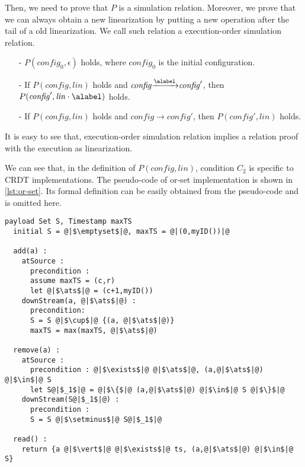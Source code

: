 Then, we need to prove that $P$ is a simulation relation. Moreover, we prove that we can always obtain a new linearization by putting a new operation after the tail of a old linearization. We call such relation a execution-order simulation relation.

\begin{itemize}
\setlength{\itemsep}{0.5pt}
\item[-] $P(\mathit{config}_0,\epsilon)$ holds, where $\mathit{config}_0$ is the initial configuration.

\item[-] If $P(\mathit{config},\mathit{lin})$ holds and $\mathit{config} {\xrightarrow{\alabel}} \mathit{config}'$, then $P(\mathit{config}', \mathit{lin} \cdot \alabel)$ holds.

\item[-] If $P(\mathit{config},\mathit{lin})$ holds and $\mathit{config} {\xrightarrow{}} \mathit{config}'$, then $P(\mathit{config}',\mathit{lin})$ holds.
\end{itemize}

It is easy to see that, execution-order simulation relation implies a \crdtlinearizable{} relation proof with the execution as linearization.

We can see that, in the definition of $P(\mathit{config},\mathit{lin})$, condition $C_2$ is specific to CRDT implementations. The pseudo-code of or-set implementation is shown in \autoref{lst:or-set}. Its formal definition can be easily obtained from the pseudo-code and is omitted here.

\begin{lstlisting}[caption={Pseudo-code of the or-set CRDT}, captionpos=b,label={lst:or-set}]
  payload Set S, Timestamp maxTS
  initial S = @|$\emptyset$|@, maxTS = @|(0,myID())|@

  add(a) :
    atSource :
      precondition :
      assume maxTS = (c,r)
      let @|$\ats$|@ = (c+1,myID())
    downStream(a, @|$\ats$|@) :
      precondition:
      S = S @|$\cup$|@ {(a, @|$\ats$|@)}
      maxTS = max(maxTS, @|$\ats$|@)

  remove(a) :
    atSource :
      precondition : @|$\exists$|@ @|$\ats$|@, (a,@|$\ats$|@) @|$\in$|@ S
      let S@|$_1$|@ = @|$\{$|@ (a,@|$\ats$|@) @|$\in$|@ S @|$\}$|@
    downStream(S@|$_1$|@) :
      precondition :
      S = S @|$\setminus$|@ S@|$_1$|@

  read() :
    return {a @|$\vert$|@ @|$\exists$|@ ts, (a,@|$\ats$|@) @|$\in$|@ S}
\end{lstlisting}


